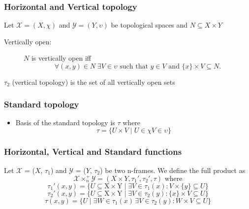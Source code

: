 \documentclass[hyperref={pdfpagelabels=false},t,10pt]{beamer}
\begin{document}
\begin{frame}
    \frametitle{Horizontal and Vertical topology}
    \begin{definition}
       Let \( \mathcal{X} = (X, \chi) \) and \( \mathcal{Y} = (Y, \upsilon) \) be topological spaces and \( N \subseteq X \times Y \) \newline

      \begin{description}
        
        
      \item[Vertically open:] \(N\) is vertically open iff 
      \[
        \forall (x, y) \in N\; \exists V \in \upsilon \text{ such that } y \in V \text{ and } \{x\} \times V \subseteq N.
      \]

    \end{description} 
    $\tau_2$ (vertical topology) is the set of all vertically open sets
      \end{definition}

      \vspace{0.5cm}
      \centering

    

\end{frame}

\begin{frame}
  \frametitle{Standard topology}

  \begin{itemize}
    \item Basis of the standard topology is $\tau$ where 
    $$\tau = \{U \times V  \mid  U \in \chi  V \in \upsilon\}$$  
  \end{itemize}

\end{frame}

\begin{frame}
  \frametitle{Horizontal, Vertical and Standard functions}
  \begin{definition}
    Let $\mathcal{X}$ = ($X$, $\tau_1$) and $\mathcal{Y}$ = ($Y$, $\tau_2$) be two n-frames. We define the full product as
      $$\mathcal{X} \times_n^+  \mathcal{Y} = (X \times Y, \tau_1', \tau_2', \tau) \text{ where}$$
      $$ \tau_1'(x,y) = \{ U \subseteq \mbox{X} \times \mbox{Y} \mid \exists V \in \tau_1(x) : V \times  \{ y \} \subseteq U \}$$
      $$ \tau_2'(x,y) = \{ U \subseteq \mbox{X} \times \mbox{Y} \mid \exists V \in \tau_2(y) : \{ x \} \times V \subseteq U \}$$
          $$ \tau(x,y) = \{ U \mid \exists W \in \tau_1(x) \, \exists V \in \tau_2(y) : W \times V \subseteq U \}$$      
  \end{definition}

\end{frame}
\end{document}
